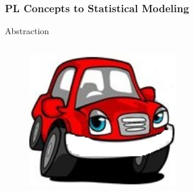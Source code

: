 \documentclass[usenames,dvipsnames]{beamer}
\begin{document}
\begin{frame}
  \frametitle{PL Concepts to Statistical Modeling}
  \begin{center}
    \LARGE Abstraction
  \end{center}
  \vspace{-1cm}
  \begin{columns}
    \begin{column}{.48\textwidth}
      \begin{figure}[ht]
        \centering
        \includegraphics[width=1.0\textwidth,height=0.65\textheight]{figures/abstraction1.png}
        \caption*{\label{fig:abstration1}}
      \end{figure}
    \end{column}
    \begin{column}{.48\textwidth}
      \begin{figure}[ht]
        \centering

\end{figure}
\end{column}
\end{columns}
\end{frame}
\end{document}
